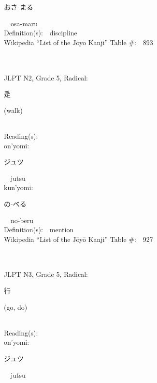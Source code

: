 \begin{multicols}{2}
{\hspace*{2em}}{\begin{CJK}{UTF8}{min} おさ-まる \end{CJK}}\ \ osa-maru\ \ \\
Definition(s):\ \ discipline \\
Wikipedia ``List of the J\=oy\=o Kanji'' Table \#:\ \ 893 \\
\ \ \\
{\fontsize{34pt}{40pt}  }\ \ \\  %
{JLPT N2, Grade 5, Radical:\ \ {\begin{CJK}{UTF8}{min} 辵 \end{CJK}} (walk) } \\
Reading(s):\ \ \\
{\hspace*{1em}}on'yomi:\ \ \\
{\hspace*{2em}}{\begin{CJK}{UTF8}{min} ジュツ \end{CJK}}\ \ jutsu\ \ \\
{\hspace*{1em}}kun'yomi:\ \ \\
{\hspace*{2em}}{\begin{CJK}{UTF8}{min} の-べる \end{CJK}}\ \ no-beru\ \ \\
Definition(s):\ \ mention \\
Wikipedia ``List of the J\=oy\=o Kanji'' Table \#:\ \ 927 \\
\ \ \\
{\fontsize{34pt}{40pt}  }\ \ \\  %
{JLPT N3, Grade 5, Radical:\ \ {\begin{CJK}{UTF8}{min} 行 \end{CJK}} (go, do) } \\
Reading(s):\ \ \\
{\hspace*{1em}}on'yomi:\ \ \\
{\hspace*{2em}}{\begin{CJK}{UTF8}{min} ジュツ \end{CJK}}\ \ jutsu\ \ \\

\end{multicols}
